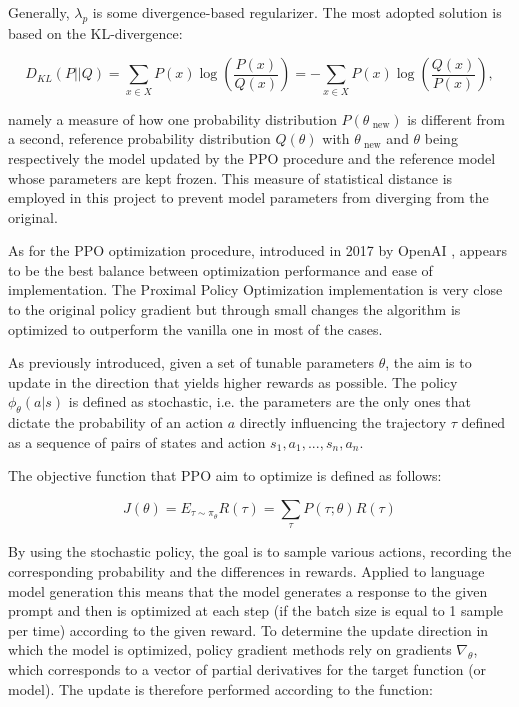 Generally, $\lambda_p$ is some divergence-based regularizer. The most adopted solution is based on the KL-divergence:

\begin{equation*}
    D_{KL} (P || Q) = \sum_{x \in X} P(x) \log{ \left ( \frac{P(x)}{Q(x)} \right )} = - \sum_{x \in X} P(x) \log{ \left ( \frac{Q(x)}{P(x)} \right )} , 
\end{equation*}

namely a measure of how one probability distribution $P(\theta_{\text{ new}})$ is different from a second, reference probability distribution $Q(\theta)$ with $\theta_{\text{ new}}$ and $\theta$ being respectively the model updated by the PPO procedure and the reference model whose parameters are kept frozen. This measure of statistical distance is employed in this project to prevent model parameters from diverging from the original.

As for the PPO optimization procedure, introduced in 2017 by OpenAI \citep{schulman2017proximal}, appears to be the best balance between optimization performance and ease of implementation. The Proximal Policy Optimization implementation is very close to the original policy gradient but through small changes the algorithm is optimized to outperform the vanilla one in most of the cases.

As previously introduced, given a set of tunable parameters $\theta$, the aim is to update in the direction that yields higher rewards as possible. The policy $\phi_\theta (a | s)$ is defined as stochastic, i.e. the parameters are the only ones that dictate the probability of an action $a$ directly influencing the trajectory $\tau$ defined as a sequence of pairs of states and action $s_1, a_1, ..., s_n, a_n$.

The objective function that PPO aim to optimize is defined as follows:

\begin{equation*}
    J (\theta) = E_{\tau \sim \pi_\theta} R(\tau) = \sum_\tau P(\tau; \theta) R(\tau)
\end{equation*}

By using the stochastic policy, the goal is to sample various actions, recording the corresponding probability and the differences in rewards. Applied to language model generation this means that the model generates a response to the given prompt and then is optimized at each step (if the batch size is equal to 1 sample per time) according to the given reward. To determine the update direction in which the model is optimized, policy gradient methods rely on gradients $\nabla_\theta$, which corresponds to a vector of partial derivatives for the target function (or model). The update is therefore performed according to the function:

